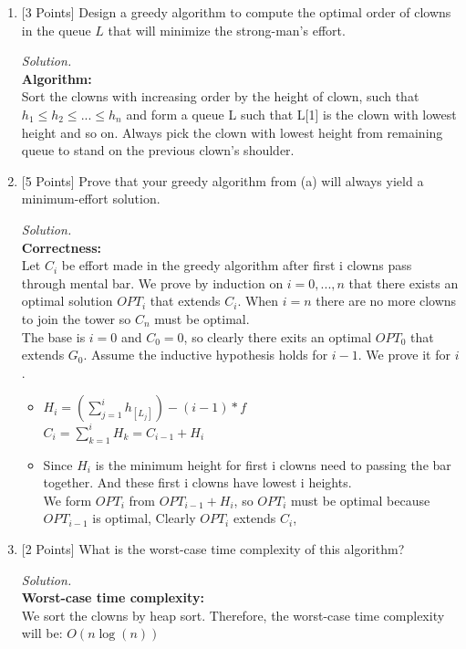\documentclass[10pt]{article}
\begin{document}
\begin{enumerate}[label=(\alph*)]
    \item {[3 Points]} Design a greedy algorithm to compute the optimal order of clowns in the queue $L$ that will minimize the strong-man’s effort.
    \begin{mdframed}
        \textit{Solution.}\\
        \textbf{Algorithm:}\\
            Sort the clowns with increasing order by the height of clown, such that $h_1 \leq h_2 \leq ... \leq h_n$ and form a queue L such that L[1] is the clown with lowest height and so on. Always pick the clown with lowest height from remaining queue to stand on the previous clown's shoulder. 
    \end{mdframed}
    \item {[5 Points]} Prove that your greedy algorithm from (a) will always yield a minimum-effort solution.
    \begin{mdframed}
        \textit{Solution.}\\
        \textbf{Correctness:}\\
        Let $C_i$ be effort made in the greedy algorithm after first i clowns pass through mental bar. We prove by induction on $i=0,...,n$ that there exists an optimal solution $OPT_i$ that extends $C_i$. When $i=n$ there are no more clowns to join the tower so $C_n$ must be optimal.\\
        The base is $i=0$ and $C_0 = 0$, so clearly there exits an optimal $OPT_0$ that extends $G_0$. Assume the inductive hypothesis holds for $i-1$. We prove it for $i$.
        \begin{itemize}\\
            \item $H_i = (\sum_{j=1}^{i} h_{[L_j]}) - (i - 1) * f$\\
            $ C_i = \sum_{k=1}^{i}H_k = C_{i-1} + H_i$
            \item Since $H_i$ is the minimum height for first i clowns need to passing the bar together. And these first i clowns have lowest i heights.\\
            We form $OPT_i$ from $OPT_{i-1} + H_i$, so $OPT_i$ must be optimal because $OPT_{i-1}$ is optimal, Clearly $OPT_i$ extends $C_{i}$,
        \end{itemize}
    \end{mdframed}
    \item {[2 Points]} What is the worst-case time complexity of this algorithm?
    \begin{mdframed}
        \textit{Solution.}\\
        \textbf{Worst-case time complexity:}\\
        We sort the clowns by heap sort. Therefore, the worst-case time complexity will be: $O(n\log(n))$


\end{mdframed}
\end{enumerate}
\end{document}
